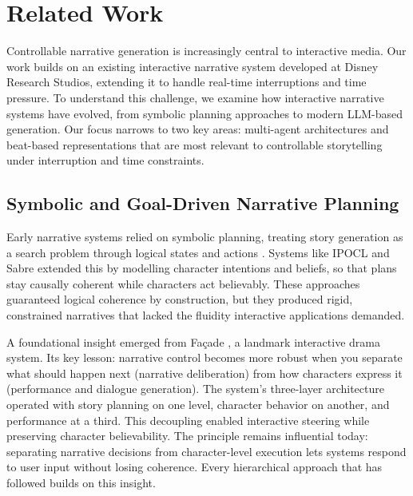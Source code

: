 \setcounter{chapter}{1}

\chapter{Related Work}\label{sec:relatedwork}


Controllable narrative generation is increasingly central to interactive media. Our work builds on an existing interactive narrative system developed at Disney Research Studios, extending it to handle real-time interruptions and time pressure. To understand this challenge, we examine how interactive narrative systems have evolved, from symbolic planning approaches to modern LLM-based generation. Our focus narrows to two key areas: multi-agent architectures and beat-based representations that are most relevant to controllable storytelling under interruption and time constraints.

\section{Symbolic and Goal-Driven Narrative Planning}

\begin{sloppypar}
Early narrative systems relied on symbolic planning, treating story generation as a search problem through logical states and actions \cite{Meehan1977}. Systems like IPOCL \cite{riedl2010narrative} and Sabre \cite{ware2021sabre} extended this by modelling character intentions and beliefs, so that plans stay causally coherent while characters act believably. These approaches guaranteed logical coherence by construction, but they produced rigid, constrained narratives that lacked the fluidity interactive applications demanded.
\end{sloppypar}

A foundational insight emerged from {Façade} \cite{mateas2003facade}, a landmark interactive drama system. Its key lesson: narrative control becomes more robust when you separate what should happen next (narrative deliberation) from how characters express it (performance and dialogue generation). The system's three-layer architecture operated with story planning on one level, character behavior on another, and performance at a third. This decoupling enabled interactive steering while preserving character believability. The principle remains influential today: separating narrative decisions from character-level execution lets systems respond to user input without losing coherence. Every hierarchical approach that has followed builds on this insight.

